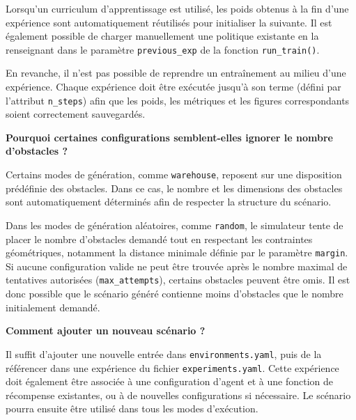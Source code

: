 \noindent Lorsqu'un curriculum d'apprentissage est utilisé, les poids obtenus à la fin d'une expérience sont automatiquement réutilisés pour initialiser la suivante. Il est également possible de charger manuellement une politique existante en la renseignant dans le paramètre \texttt{previous\_exp} de la fonction \texttt{run\_train()}.

\vspace{10pt}

\noindent En revanche, il n'est pas possible de reprendre un entraînement au milieu d'une expérience. Chaque expérience doit être exécutée jusqu'à son terme (défini par l'attribut \texttt{n\_steps}) afin que les poids, les métriques et les figures correspondants soient correctement sauvegardés.

\vspace{10pt}

\noindent \textbf{Pourquoi certaines configurations semblent-elles ignorer le nombre d'obstacles ?}

\vspace{10pt}

\noindent Certains modes de génération, comme \texttt{warehouse}, reposent sur une disposition prédéfinie des obstacles. Dans ce cas, le nombre et les dimensions des obstacles sont automatiquement déterminés afin de respecter la structure du scénario.

\vspace{10pt}

\noindent Dans les modes de génération aléatoires, comme \texttt{random}, le simulateur tente de placer le nombre d'obstacles demandé tout en respectant les contraintes géométriques, notamment la distance minimale définie par le paramètre \texttt{margin}. Si aucune configuration valide ne peut être trouvée après le nombre maximal de tentatives autorisées (\texttt{max\_attempts}), certains obstacles peuvent être omis. Il est donc possible que le scénario généré contienne moins d'obstacles que le nombre initialement demandé.

\vspace{10pt}

\noindent \textbf{Comment ajouter un nouveau scénario ?}

\vspace{10pt}

\noindent Il suffit d'ajouter une nouvelle entrée dans \texttt{environments.yaml}, puis de la référencer dans une expérience du fichier \texttt{experiments.yaml}. Cette expérience doit également être associée à une configuration d'agent et à une fonction de récompense existantes, ou à de nouvelles configurations si nécessaire. Le scénario pourra ensuite être utilisé dans tous les modes d'exécution.


